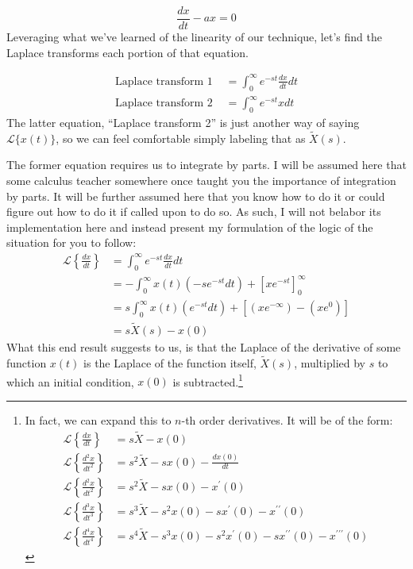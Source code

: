 \documentclass[11pt]{book}
\begin{document}
\begin{equation}
	\frac{dx}{dt} - ax = 0
\end{equation}
Leveraging what we've learned of the linearity of our technique, let's find the Laplace transforms each portion of that equation. 

\begin{align}
	\text{Laplace transform 1 } &= \int_{0}^{\infty} e^{-st}\frac{dx}{dt} dt \\
	\text{Laplace transform 2 } &= \int_{0}^{\infty} e^{-st} x dt
\end{align}
The latter equation, ``Laplace transform 2'' is just another way of saying $\mathcal{L}\{x(t)\}$, so we can feel comfortable simply labeling that as $\tilde{X}(s)$.

The former equation requires us to integrate by parts. I will be assumed here that some calculus teacher somewhere once taught you the importance of integration by parts. It will be further assumed here that you know how to do it or could figure out how to do it if called upon to do so. As such, I will not belabor its implementation here and instead present my formulation of the logic of the situation for you to follow:
\begin{align}
	\mathcal{L}\left\{\frac{dx}{dt}\right\} &= \int_{0}^{\infty} e^{-st}\frac{dx}{dt} dt \\ 
	&= -\int_{0}^{\infty} x(t)\left(-se^{-st}dt\right) + \left[xe^{-st}\right]_0^{\infty} \\
	&= s\int_{0}^{\infty} x(t)\left(e^{-st}dt\right) + \left[\left(xe^{-\infty}\right) - \left(xe^{0}\right) \right]\\
	&= s\tilde{X}(s) - x(0)
\end{align}
What this end result suggests to us, is that the Laplace of the derivative of some function $x(t)$ is the Laplace of the function itself, $\tilde{X}(s)$, multiplied by $s$ to which an initial condition, $x(0)$ is subtracted.\footnote{In fact, we can expand this to $n$-th order derivatives. It will be of the form:
\begin{align}
	\mathcal{L}\left\{\frac{dx}{dt}\right\} &= s\tilde{X} - x(0)\\
	\mathcal{L}\left\{\frac{d^2x}{dt^2}\right\} &= s^2\tilde{X} - sx(0) - \frac{dx(0)}{dt} \\
	\mathcal{L}\left\{\frac{d^2x}{dt^2}\right\} &= s^2\tilde{X} - sx(0) - x^{\prime}(0) \\
	\mathcal{L}\left\{\frac{d^3x}{dt^3}\right\} &= s^3\tilde{X} - s^2x(0) - sx^{\prime}(0) - x^{\prime\prime}(0) \\
	\mathcal{L}\left\{\frac{d^4x}{dt^4}\right\} &= s^4\tilde{X} - s^3x(0) - s^2x^{\prime}(0) - sx^{\prime\prime}(0) - x^{\prime\prime\prime}(0)
\end{align}}
\end{document}
